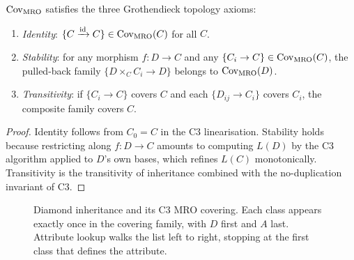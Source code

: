 \documentclass[11pt]{article}
\newcommand{\Clin}[1]{L(#1)}                     %
\newcommand{\MROCov}[1]{\mathcal{U}_{#1}}         %
\begin{document}
\begin{proposition}\label{prop:groth-axioms}
  $\mathrm{Cov}_{\mathrm{MRO}}$ satisfies the three Grothendieck topology axioms:
  \begin{enumerate}[leftmargin=1.5em,label=(\roman*)]
    \item \emph{Identity}: $\{C \xrightarrow{\mathrm{id}} C\} \in
      \mathrm{Cov}_{\mathrm{MRO}}(C)$ for all $C$.
    \item \emph{Stability}: for any morphism $f\colon D \to C$ and any
      $\{C_i \to C\} \in \mathrm{Cov}_{\mathrm{MRO}}(C)$, the pulled-back family
      $\{D \times_C C_i \to D\}$ belongs to $\mathrm{Cov}_{\mathrm{MRO}}(D)$.
    \item \emph{Transitivity}: if $\{C_i \to C\}$ covers $C$ and each
      $\{D_{ij} \to C_i\}$ covers $C_i$, the composite family covers $C$.
  \end{enumerate}
\end{proposition}

\begin{proof}
  Identity follows from $C_0 = C$ in the C3 linearisation.
  Stability holds because restricting along $f\colon D \to C$ amounts
  to computing $\Clin{D}$ by the C3 algorithm applied to $D$'s own bases,
  which refines $\Clin{C}$ monotonically.
  Transitivity is the transitivity of inheritance combined with the
  no-duplication invariant of C3.
\end{proof}

\begin{figure}[h]
  \centering
  \caption{Diamond inheritance and its C3 MRO covering.
    Each class appears exactly once in the covering family, with
    $D$ first and $A$ last.  Attribute lookup walks the list left to
    right, stopping at the first class that defines the attribute.}
  \label{fig:diamond}
\end{figure}
\end{document}
